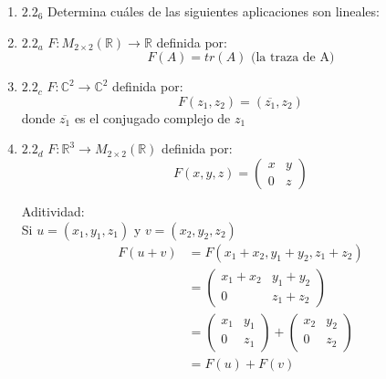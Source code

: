 \documentclass{article}
\begin{document}
		\begin{enumerate}
			
			\item[] \(2.2_6\) Determina cuáles de las siguientes aplicaciones son lineales:
			
			\item \(2.2_a\) 
			\(F:M_{2\times2}(\mathbb{R})\to \mathbb{R}\) definida por:
			\begin{equation*}
				F(A) = tr(A) \text{ (la traza de A)}
			\end{equation*}
			
			\item \(2.2_c\) 
			\(F:\mathbb{C}^2 \to \mathbb{C}^2\) definida por:
			\begin{equation*}
				F(z_1, z_2) = (\overline{z_1}, z_2)
			\end{equation*}
			donde \(\overline{z_1}\) es el conjugado complejo de \(z_1\)
			
			\item \(2.2_d\) 
			\(F:\mathbb{R}^3 \to M_{2\times2}(\mathbb{R})\) definida por:
			\begin{equation*}
				F(x,y,z) = 
				\begin{pmatrix}
					x & y \\
					0 & z
				\end{pmatrix}
			\end{equation*}
			
			Aditividad:\\
			Si \(u=(x_1,y_1,z_1)\) y \(v=(x_2,y_2,z_2)\)
			\begin{equation*}
				\begin{aligned}
					F(u+v) &=F(x_1+x_2,y_1+y_2,z_1+z_2)\\ 
						   &=\begin{pmatrix}
						   		x_1+x_2 & y_1+y_2 \\
						   		0       & z_1+z_2
						     \end{pmatrix}\\ 
						   &=\begin{pmatrix}
						   		x_1 & y_1 \\
						   		0   & z_1
						     \end{pmatrix} +
						     \begin{pmatrix}
						     	x_2 & y_2\\
						     	0   & z_2
						     \end{pmatrix}\\
						   &=F(u)+F(v)
				\end{aligned}
			\end{equation*}
			

\end{enumerate}
\end{document}
